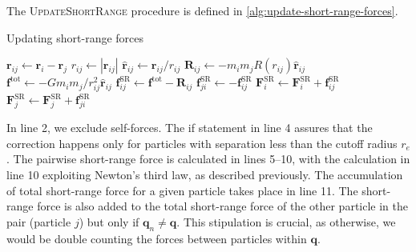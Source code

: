 The \textsc{UpdateShortRange} procedure is defined in \autoref{alg:update-short-range-forces}.
\begin{algorithm}
    \caption{Updating short-range forces}\label{alg:update-short-range-forces}
    \begin{algorithmic}[1]
        \Return
        \EndIf
        \State $\mathbf{r}_{ij} \gets \mathbf{r}_i - \mathbf{r}_j$
        \Return
        \EndIf
        \State $r_{ij} \gets |\mathbf{r}_{ij}|$
        \State $\mathbf{\hat{r}}_{ij} \gets \mathbf{r}_{ij} / r_{ij}$
        \State $\mathbf{R}_{ij} \gets -m_i m_j R(r_{ij}) \mathbf{\hat{r}}_{ij}$
        \State $\mathbf{f}^\text{tot} \gets -G m_i m_j / r_{ij}^2 \mathbf{\hat{r}}_{ij}$
        \State $\mathbf{f}^\text{SR}_{ij} \gets \mathbf{f}^\text{tot} - \mathbf{R}_{ij}$
        \State $\mathbf{f}^\text{SR}_{ji} \gets -\mathbf{f}^\text{SR}_{ij}$
        \State $\mathbf{F}^\text{SR}_i \gets \mathbf{F}^\text{SR}_i + \mathbf{f}^\text{SR}_{ij}$
         
        \State $\mathbf{F}^\text{SR}_j \gets \mathbf{F}^\text{SR}_j + \mathbf{f}^\text{SR}_{ji}$
        \EndIf
        \EndProcedure
    \end{algorithmic}
\end{algorithm}
In line 2, we exclude self-forces.
The if statement in line 4 assures that the correction happens only for particles with separation less than the cutoff radius $r_e$.
The pairwise short-range force is calculated in lines 5--10, with the calculation in line 10 exploiting Newton's third law, as described previously.
The accumulation of total short-range force for a given particle takes place in line 11.
The short-range force is also added to the total short-range force of the other particle in the pair (particle $j$) but only if $\mathbf{q}_n \neq \mathbf{q}$.
This stipulation is crucial, as otherwise, we would be double counting the forces between particles within $\mathbf{q}$.

